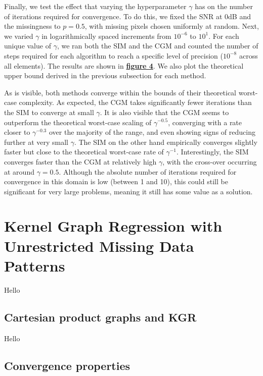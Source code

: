 Finally, we test the effect that varying the hyperparameter $\gamma$ has on the number of iterations required for convergence. To do this, we fixed the SNR at 0dB and the missingness to $p=0.5$, with missing pixels chosen uniformly at random. Next, we varied $\gamma$ in logarithmically spaced increments from $10^{-6}$ to $10^1$. For each unique value of $\gamma$, we ran both the SIM and the CGM and counted the number of steps required for each algorithm to reach a specific level of precision ($10^{-8}$ across all elements). The results are shown in \hyperlink{complexity}{\textbf{figure 4}}. We also plot the theoretical upper bound derived in the previous subsection for each method.

As is visible, both methods converge within the bounds of their theoretical worst-case complexity. As expected, the CGM takes significantly fewer iterations than the SIM to converge at small $\gamma$. It is also visible that the CGM seems to outperform the theoretical worst-case scaling of $\gamma^{-0.5}$, converging with a rate closer to $\gamma^{-0.3}$ over the majority of the range, and even showing signs of reducing further at very small $\gamma$. The SIM on the other hand empirically converges slightly faster but close to the theoretical worst-case rate of $\gamma^{-1}$. Interestingly, the SIM converges faster than the CGM at relatively high $\gamma$, with the cross-over occurring at around $\gamma=0.5$. Although the absolute number of iterations required for convergence in this domain is low (between 1 and 10), this could still be significant for very large problems, meaning it still has some value as a solution.




\section{Kernel Graph Regression with Unrestricted Missing Data Patterns}

\label{sec:kgr_mdp}

Hello

\subsection{Cartesian product graphs and KGR}

Hello

\subsection{Convergence properties}

